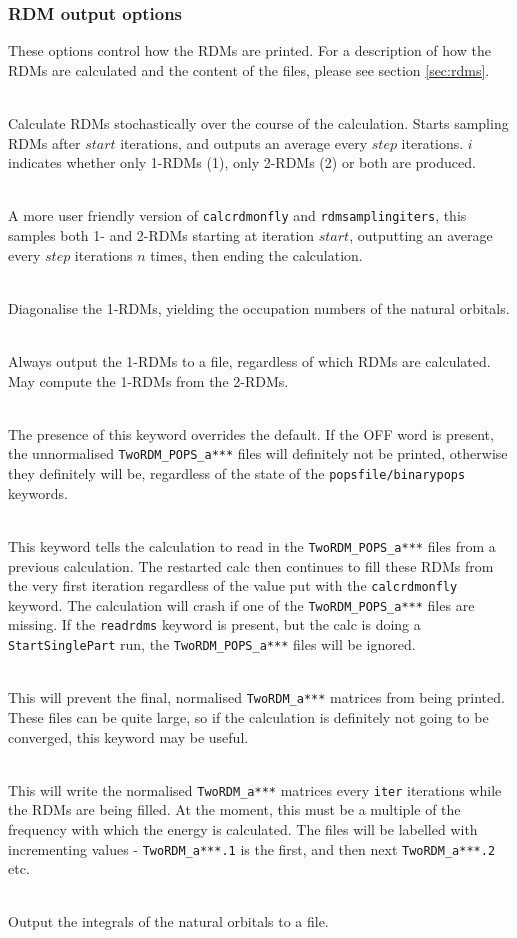 \documentclass[a4paper,notitlepage]{scrreprt}
\newcommand\codeitem[1]{\needspace{1.5\baselineskip}\item[\textnormal{\ttfamily #1 \nopagebreak}] \hfill \\ \nopagebreak}
\let\code\lstinline
\begin{document}
    \subsubsection{RDM output options}
    These options control how the RDMs are printed. For a description of how
    the RDMs are calculated and the content of the files, please see section \ref{sec:rdms}.
    \begin{description}
      \codeitem{calcrdmonfly $i$ $step$ $start$}
      Calculate RDMs stochastically over the course of the calculation. Starts
      sampling RDMs after $start$ iterations, and outputs an average every $step$
      iterations. $i$ indicates whether only 1-RDMs (1), only 2-RDMs (2) or
      both are produced.
      \codeitem{rdmlinspace $start$ $n$ $step$}
      A more user friendly version of \texttt{calcrdmonfly} and \texttt{rdmsamplingiters}, this samples both
      1- and 2-RDMs starting at iteration $start$, outputting an average every
      $step$ iterations $n$ times, then ending the calculation.
      \codeitem{diagflyonerdm}
      Diagonalise the 1-RDMs, yielding the occupation numbers of the natural
      orbitals.
      \codeitem{printonerdm}
      Always output the 1-RDMs to a file, regardless of which RDMs are
      calculated. May compute the 1-RDMs from the 2-RDMs.
		\codeitem{writerdmstoread off}
	The presence of this keyword overrides the default.  If the OFF word is present, the unnormalised \code{TwoRDM_POPS_a***}
    files will definitely not be printed, otherwise they definitely will be, regardless of the state of the
    \code{popsfile/binarypops} keywords.

    \codeitem{readrdms}
    This keyword tells the calculation to read in the \code{TwoRDM_POPS_a***} files from a previous calculation.  The
    restarted calc then continues to fill these RDMs from the very first iteration regardless of the value put with
    the \code{calcrdmonfly} keyword.  The calculation will crash if one of the \code{TwoRDM_POPS_a***} files are missing.  If
    the \code{readrdms} keyword is present, but the calc is doing a \code{StartSinglePart} run, the \code{TwoRDM_POPS_a***} files
    will be ignored.

    \codeitem{nonormrdms}
    This will prevent the final, normalised \code{TwoRDM_a***} matrices from being printed.  These files can be quite
    large, so if the calculation is definitely not going to be converged, this keyword may be useful.

    \codeitem{writerdmsevery iter}
    This will write the normalised \code{TwoRDM_a***} matrices every \code{iter} iterations while the RDMs are being
    filled.  At the moment, this must be a multiple of the frequency with which the energy is calculated.  The
    files will be labelled with incrementing values - \code{TwoRDM_a***.1} is the first, and then next \code{TwoRDM_a***.2} etc.      
      \codeitem{printrodump}
      Output the integrals of the natural orbitals to a file.
    \end{description}
\end{document}
